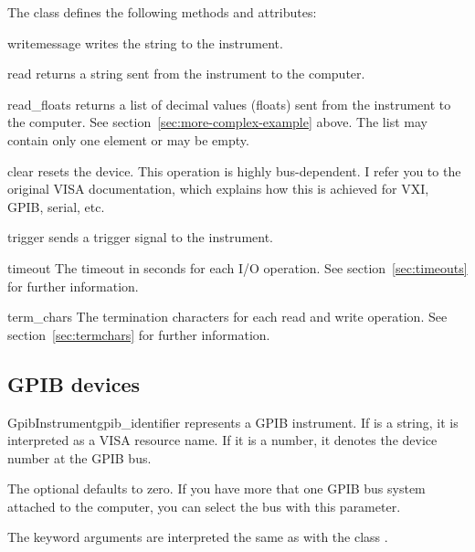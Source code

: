 \documentclass{howto}
\begin{document}
The class  defines the following methods and attributes:

\begin{methoddesc}{write}{message}
  writes the string  to the instrument.
\end{methoddesc}

\begin{methoddesc}{read}{}
  returns a string sent from the instrument to the computer.
\end{methoddesc}

\begin{methoddesc}{read_floats}{}
  returns a list of decimal values (floats) sent from the instrument to the
  computer.  See section~\ref{sec:more-complex-example} above.  The list may
  contain only one element or may be empty.
\end{methoddesc}

\begin{methoddesc}{clear}{}
  resets the device.  This operation is highly bus-dependent.  I refer you to
  the original VISA documentation, which explains how this is achieved for VXI,
  GPIB, serial, etc.
\end{methoddesc}

\begin{methoddesc}{trigger}{}
  sends a trigger signal to the instrument.
\end{methoddesc}

\begin{memberdesc}{timeout}
  The timeout in seconds for each I/O operation.  See
  section~\ref{sec:timeouts} for further information.
\end{memberdesc}

\begin{memberdesc}{term_chars}
  The termination characters for each read and write operation.  See
  section~\ref{sec:termchars} for further information.
\end{memberdesc}


\subsection{GPIB devices}
\label{sec:gpib-devices}

\begin{classdesc}{GpibInstrument}{gpib_identifier}
  represents a GPIB instrument.  If  is a string, it is
  interpreted as a VISA resource name.  If it is a number, it denotes the
  device number at the GPIB bus.

  The optional  defaults to zero.  If you have more that one
  GPIB bus system attached to the computer, you can select the bus with this
  parameter.

  The keyword arguments are interpreted the same as with the class
  .
\end{classdesc}
\end{document}
